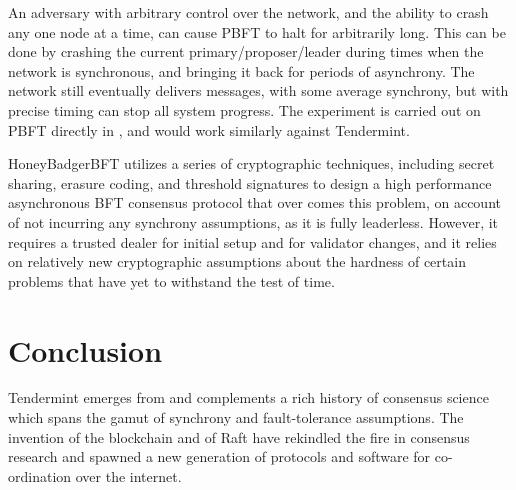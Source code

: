 An adversary with arbitrary control over the network, 
and the ability to crash any one node at a time,
can cause PBFT to halt for arbitrarily long.
This can be done by crashing the current primary/proposer/leader during times when the network is synchronous,
and bringing it back for periods of asynchrony.
The network still eventually delivers messages, with some average synchrony,
but with precise timing can stop all system progress.
The experiment is carried out on PBFT directly in \cite{honeybadger}, and would work similarly against Tendermint.

HoneyBadgerBFT utilizes a series of cryptographic techniques, including secret sharing, erasure coding, 
and threshold signatures to design a high performance asynchronous BFT consensus protocol
that over comes this problem, on account of not incurring any synchrony assumptions, as it is fully leaderless.
However, it requires a trusted dealer for initial setup and for validator changes, 
and it relies on relatively new cryptographic assumptions about the hardness of certain problems that have 
yet to withstand the test of time.

\section{Conclusion}

Tendermint emerges from and complements a rich history of consensus science which spans the gamut of synchrony and fault-tolerance assumptions. 
The invention of the blockchain and of Raft have rekindled the fire in consensus research and spawned a new generation 
of protocols and software for co-ordination over the internet.
